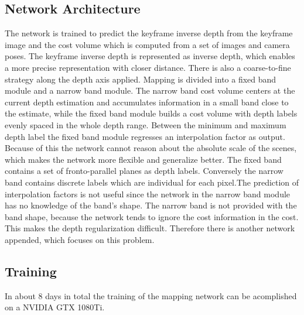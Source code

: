 \subsection{Network Architecture}
The network is trained to predict the keyframe inverse depth from the keyframe image and the cost volume which is computed from a set of images and camera poses. The keyframe inverse depth is represented as inverse depth, which enables a more precise representation with closer distance. There is also a coarse-to-fine strategy along the depth axis applied. Mapping is divided into a fixed band module and a narrow band module. The narrow band cost volume centers at the current depth estimation and accumulates information in a small band close to the estimate, while the fixed band module builds a cost volume with depth labels evenly spaced in the whole depth range.
\newline
\newline
Between the minimum and maximum depth label the fixed band module regresses an interpolation factor as output. Because of this the network cannot reason about the absolute scale of the scenes, which makes the network more flexible and generalize better. The fixed band contains a set of fronto-parallel planes as depth labels. Conversely the narrow band contains discrete labels which are individual for each pixel.The prediction of interpolation factors is not useful since the network in the narrow band module has no knowledge of the band’s shape. The narrow band is not provided with the band shape, because the network tends to ignore the cost information in the cost. This makes the depth regularization difficult. Therefore there is another network appended, which focuses on this problem.

\subsection{Training}
In about 8 days in total the training of the mapping network can be acomplished on a NVIDIA GTX 1080Ti.






